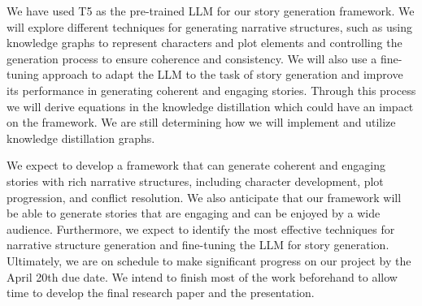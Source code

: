 \documentclass[letterpaper]{article}
\begin{document}
We have used T5 as the pre-trained LLM for our story generation framework. We will explore different techniques for generating narrative structures, such as using knowledge graphs to represent characters and plot elements and controlling the generation process to ensure coherence and consistency. We will also use a fine-tuning approach to adapt the LLM to the task of story generation and improve its performance in generating coherent and engaging stories. Through this process we will derive equations in the knowledge distillation which could have an impact on the framework. We are still determining how we will implement and utilize knowledge distillation graphs.

We expect to develop a framework that can generate coherent and engaging stories with rich narrative structures, including character development, plot progression, and conflict resolution. We also anticipate that our framework will be able to generate stories that are engaging and can be enjoyed by a wide audience. Furthermore, we expect to identify the most effective techniques for narrative structure generation and fine-tuning the LLM for story generation. Ultimately, we are on schedule to make significant progress on our project by the April 20th due date. We intend to finish most of the work beforehand to allow time to develop the final research paper and the presentation.



\end{document}
